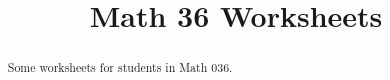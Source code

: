 \documentclass{xourse}
\title{Math 36 Worksheets}
\begin{document}
\begin{abstract} %
Some worksheets for students in Math 036.
\end{abstract}
\maketitle
\end{document}
